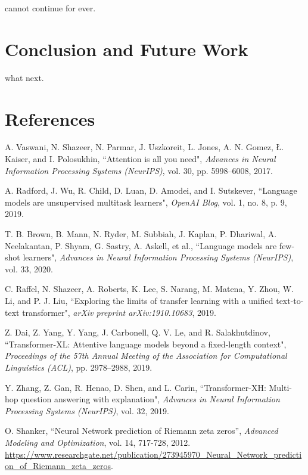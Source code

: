 \documentclass[journal]{IEEEtai}
\begin{document}
cannot continue for ever.


\section{Conclusion and Future Work}

what next.





\section*{References}

\begin{thebibliography}{34}

A. Vaswani, N. Shazeer, N. Parmar, J. Uszkoreit, L. Jones, A. N. Gomez, Ł. Kaiser, and I. Polosukhin, ``Attention is all you need",  \emph{Advances in Neural Information Processing Systems (NeurIPS)}, vol. 30, pp. 5998--6008, 2017.

A. Radford, J. Wu, R. Child, D. Luan, D. Amodei, and I. Sutskever, ``Language models are unsupervised multitask learners", \emph{OpenAI Blog}, vol. 1, no. 8, p. 9, 2019.

T. B. Brown, B. Mann, N. Ryder, M. Subbiah, J. Kaplan, P. Dhariwal, A. Neelakantan, P. Shyam, G. Sastry, A. Askell, et al., ``Language models are few-shot learners",  \emph{Advances in Neural Information Processing Systems (NeurIPS)}, vol. 33, 2020.

C. Raffel, N. Shazeer, A. Roberts, K. Lee, S. Narang, M. Matena, Y. Zhou, W. Li, and P. J. Liu, ``Exploring the limits of transfer learning with a unified text-to-text transformer", \emph{arXiv preprint arXiv:1910.10683}, 2019.

Z. Dai, Z. Yang, Y. Yang, J. Carbonell, Q. V. Le, and R. Salakhutdinov, ``Transformer-XL: Attentive language models beyond a fixed-length context",  \emph{Proceedings of the 57th Annual Meeting of the Association for Computational Linguistics (ACL)}, pp. 2978--2988, 2019.

Y. Zhang, Z. Gan, R. Henao, D. Shen, and L. Carin, ``Transformer-XH: Multi-hop question answering with explanation",  \emph{Advances in Neural Information Processing Systems (NeurIPS)}, vol. 32, 2019.

 O. Shanker, ``Neural Network prediction of Riemann zeta zeros'',
\emph{Advanced Modeling and Optimization}, vol. 14, 717-728, 2012. \url{https://www.researchgate.net/publication/273945970_Neural_Network_prediction_of_Riemann_zeta_zeros}.


\end{thebibliography}
\end{document}
